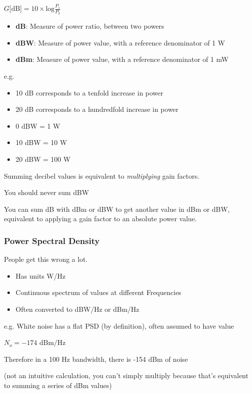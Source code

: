 \documentclass[12pt]{article}
\begin{document}
\begin{math}
    G \text{[dB]} = 10\times \text{log}\frac{P_1}{P_2}
\end{math}

\begin{itemize}[noitemsep]
    \item \textbf{dB}: Measure of power ratio, between two powers
    \item \textbf{dBW}: Measure of power value, with a reference denominator of 1 W
    \item \textbf{dBm}: Measure of power value, with a reference denominator of 1 mW
\end{itemize}

\begin{framed}
e.g.
\begin{itemize}[noitemsep]
    \item 10 dB corresponds to a tenfold increase in power
    \item 20 dB corresponds to a hundredfold increase in power
    \item 0 dBW = 1 W
    \item 10 dBW = 10 W
    \item 20 dBW = 100 W
\end{itemize}
\end{framed}

Summing decibel v\textbf{}alues is equivalent to \textit{multiplying} gain factors.

You should never sum dBW

You can sum dB with dBm or dBW to get another value in dBm or dBW, equivalent to applying a gain factor to an absolute power value.

\subsubsection{Power Spectral Density}
People get this wrong a lot.

\begin{itemize}[noitemsep]
    \item Has units W/Hz
    \item Continuous spectrum of values at different Frequencies
    \item Often converted to dBW/Hz or dBm/Hz
\end{itemize}

\begin{framed}
e.g.
White noise has a flat PSD (by definition), often assumed to have value

\begin{math}
N_o = -174 \text{ dBm/Hz}
\end{math}

Therefore in a 100 Hz bandwidth, there is -154 dBm of noise

(not an intuitive calculation, you can't simply multiply because that's equivalent to summing a series of dBm values)
\end{framed}
\end{document}
